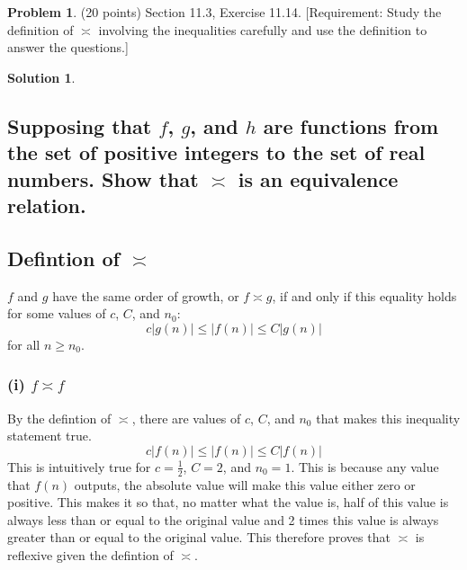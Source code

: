 \documentclass{article}
\theoremstyle{definition}
\newtheorem{problem}{Problem}
\newtheorem*{solution}{Solution}
\begin{document}
\newpage
\begin{problem} (20 points) Section 11.3, Exercise 11.14.
[Requirement: Study the definition of $\asymp$ involving the inequalities carefully 
and use the definition to answer the questions.] 
\end{problem}
\begin{solution}
\hspace{1cm}
\subsection*{Supposing that $f$, $g$, and $h$ are functions from the set of positive integers to the set of real numbers. Show that $\asymp$ is an equivalence relation.}
\subsection*{Defintion of $\asymp$}
$f$ and $g$ have the same order of growth, or $f \asymp g$, if and only if this equality holds for some values of $c$, $C$, and $n_0$:
$$ c|g(n)| \leqslant |f(n)| \leqslant C|g(n)| $$
for all $n \geqslant n_0$.
\subsubsection*{(i) $f \asymp f$}
By the defintion of $\asymp$, there are values of $c$, $C$, and $n_0$ that makes this inequality statement true.
$$ c|f(n)| \leqslant |f(n)| \leqslant C|f(n)|$$
This is intuitively true for $c = \frac{1}{2}$, $C = 2$, and $n_0 = 1$. This is because any value that $f(n)$ outputs, the absolute value will make this value either zero or positive. This makes it so that, no matter what the value is, half of this value is always less than or equal to the original value and 2 times this value is always greater than or equal to the original value. This therefore proves that $\asymp$ is reflexive given the defintion of $\asymp$.

\end{solution}
\end{document}
